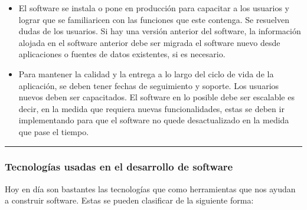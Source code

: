 \documentclass[letterpaper,10pt,spanish]{sphinxmanual}
\begin{document}
\begin{itemize}
\begin{itemize}
\item {} 
\sphinxAtStartPar
Pruebas de rendimiento para simular niveles de carga de uso en la aplicación. Por ejemplo Identificar en que momento el aplicativo puede presentar fallos cuando varios usuarios lo usen al mismo tiempo.

\end{itemize}

\item {} 
\sphinxAtStartPar
{}

\sphinxAtStartPar
El software se instala o pone en producción para capacitar a los usuarios y lograr que se familiaricen con las funciones que este contenga. Se resuelven dudas de los usuarios. Si hay una versión anterior del software, la información alojada en el software anterior debe ser migrada el software nuevo desde aplicaciones o fuentes de datos existentes, si es necesario.

\item {} 
\sphinxAtStartPar
{}

\sphinxAtStartPar
Para mantener la calidad y la entrega a lo largo del ciclo de vida de la aplicación, se deben tener fechas de seguimiento y soporte. Los usuarios nuevos deben ser capacitados. El software en lo posible debe ser escalable es decir, en la medida que requiera nuevas funcionalidades, estas se deben ir implementando para que el software no quede desactualizado en la medida que pase el tiempo.

\end{itemize}


\bigskip\hrule\bigskip



\subsubsection{Tecnologías usadas en el desarrollo de software}
\label{\detokenize{1_guias/10programacion/G1021:tecnologias-usadas-en-el-desarrollo-de-software}}
\sphinxAtStartPar
Hoy en día son bastantes las tecnologías que  como herramientas que nos ayudan a construir software. Estas se pueden clasificar de la siguiente forma:
\end{document}
